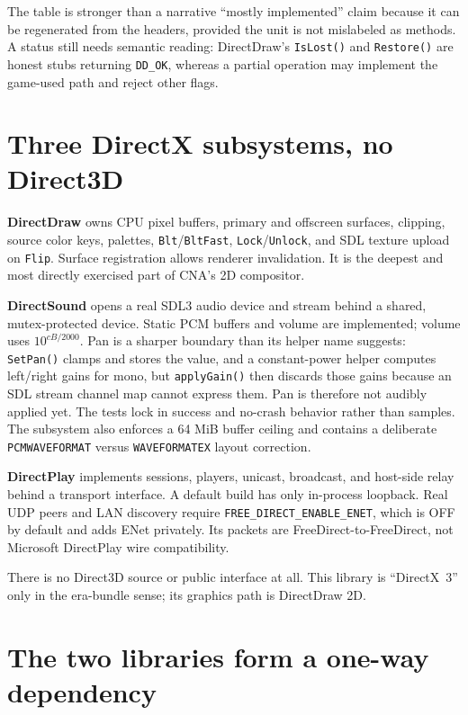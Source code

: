 The table is stronger than a narrative ``mostly implemented'' claim because it can be
regenerated from the headers, provided the unit is not mislabeled as methods. A status still
needs semantic reading: DirectDraw's
\texttt{IsLost()} and \texttt{Restore()} are honest stubs returning \texttt{DD\_OK}, whereas a
partial operation may implement the game-used path and reject other flags.

\section{Three DirectX subsystems, no Direct3D}

\textbf{DirectDraw} owns CPU pixel buffers, primary and offscreen surfaces, clipping, source
color keys, palettes, \texttt{Blt}/\texttt{BltFast}, \texttt{Lock}/\texttt{Unlock}, and SDL
texture upload on \texttt{Flip}. Surface registration allows renderer invalidation. It is the
deepest and most directly exercised part of CNA's 2D compositor.

\textbf{DirectSound} opens a real SDL3 audio device and stream behind a shared, mutex-protected
device. Static PCM buffers and volume are implemented; volume uses $10^{cB/2000}$. Pan is a
sharper boundary than its helper name suggests: \texttt{SetPan()} clamps and stores the value,
and a constant-power helper computes left/right gains for mono, but \texttt{applyGain()} then
discards those gains because an SDL stream channel map cannot express them. Pan is therefore
not audibly applied yet. The tests lock in success and no-crash behavior rather than samples.
The subsystem also enforces a 64 MiB buffer ceiling and contains a deliberate
\texttt{PCMWAVEFORMAT} versus \texttt{WAVEFORMATEX} layout correction.

\textbf{DirectPlay} implements sessions, players, unicast, broadcast, and host-side relay
behind a transport interface. A default build has only in-process loopback. Real UDP peers and
LAN discovery require \texttt{FREE\_DIRECT\_ENABLE\_ENET}, which is OFF by default and adds
ENet privately. Its packets are FreeDirect-to-FreeDirect, not Microsoft DirectPlay wire
compatibility.

There is no Direct3D source or public interface at all. This library is ``DirectX~3'' only in
the era-bundle sense; its graphics path is DirectDraw 2D.

\section{The two libraries form a one-way dependency}

